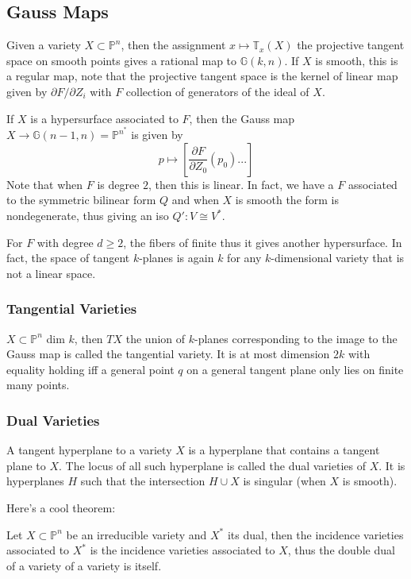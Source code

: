 \documentclass[main.tex]{subfiles}
\newcommand{\Pn}[1]{\mathbb{P}^{#1}}
\begin{document}
\subsection{Gauss Maps}
Given a variety $X \subset \Pn{n}$, then the assignment $x \mapsto \mathbb{T}_x(X)$ the projective tangent space on smooth points gives a rational map to $\mathbb{G}(k,n)$. If $X$ is smooth, this is a regular map, note that the projective tangent space is the kernel of linear map given by $\partial F/\partial Z_i$ with $F$ collection of generators of the ideal of $X$.

\begin{example}
If $X$ is a hypersurface associated to $F$, then the Gauss map $X \rightarrow \mathbb{G}(n-1, n) = \Pn{n}^*$ is given by 
$$
p \mapsto [\frac{\partial F}{\partial Z_0}(p_0) ...]
$$
Note that when $F$ is degree $2$, then this is linear. In fact, we have a $F$ associated to the symmetric bilinear form $Q$ and when $X$ is smooth the form is nondegenerate, thus giving an iso $Q': V \cong V^*$.

For $F$ with degree $d \geq 2$, the fibers of finite thus it gives another hypersurface. In fact, the space of tangent $k$-planes is again $k$ for any $k$-dimensional variety that is not a linear space.
\end{example}

\subsubsection{Tangential Varieties}
$X \subset \Pn{n}$ dim $k$, then $TX$ the union of $k$-planes corresponding to the image to the Gauss map is called the tangential variety. It is at most dimension $2k$ with equality holding iff a general point $q$ on a general tangent plane only lies on finite many points.

\subsubsection{Dual Varieties}
A tangent hyperplane to a variety $X$ is a hyperplane that contains a tangent plane to $X$. The locus of all such hyperplane is called the dual varieties of $X$. It is hyperplanes $H$ such that the intersection $H \cup X$ is singular (when $X$ is smooth).

Here's a cool theorem:
\begin{theorem}
Let $X \subset \Pn{n}$ be an irreducible variety and $X^*$ its dual, then the incidence varieties associated to $X^*$ is the incidence varieties associated to $X$, thus the double dual of a variety of a variety is itself.
\end{theorem}
\end{document}
